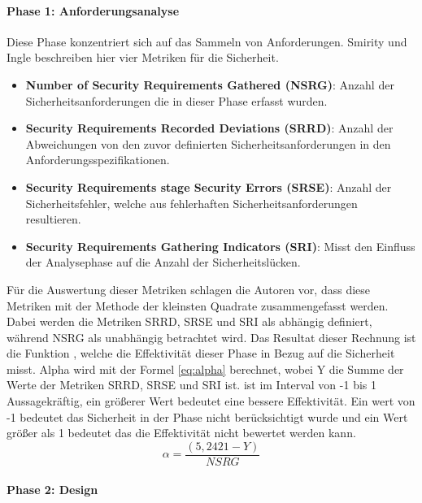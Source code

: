 \documentclass[12pt, a4paper, ngerman]{article}
\begin{document}
\paragraph{Phase 1: Anforderungsanalyse}

Diese Phase konzentriert sich auf das Sammeln von Anforderungen.
Smirity und Ingle beschreiben hier vier Metriken für die Sicherheit.
\begin{itemize}
  \item \textbf{Number of Security Requirements Gathered (NSRG)}: Anzahl der Sicherheitsanforderungen die in dieser Phase erfasst wurden.
  \item \textbf{Security Requirements Recorded Deviations (SRRD)}: Anzahl der Abweichungen von den zuvor definierten Sicherheitsanforderungen in den Anforderungsspezifikationen.
  \item \textbf{Security Requirements stage Security Errors (SRSE)}: Anzahl der Sicherheitsfehler, welche aus fehlerhaften Sicherheitsanforderungen resultieren.
  \item \textbf{Security Requirements Gathering Indicators (SRI)}: Misst den Einfluss der Analysephase auf die Anzahl der Sicherheitslücken. 
\end{itemize}
Für die Auswertung dieser Metriken schlagen die Autoren vor, dass diese Metriken mit der Methode der kleinsten Quadrate zusammengefasst werden.
Dabei werden die Metriken SRRD, SRSE und SRI als abhängig definiert, während NSRG als unabhängig betrachtet wird.
Das Resultat dieser Rechnung ist die Funktion \alpha, welche die Effektivität dieser Phase in Bezug auf die Sicherheit misst.
Alpha wird mit der Formel \ref{eq:alpha} berechnet, wobei Y die Summe der Werte der Metriken SRRD, SRSE und SRI ist.
\alpha ist im Interval von -1 bis 1 Aussagekräftig, ein größerer Wert bedeutet eine bessere Effektivität.
Ein wert von -1 bedeutet das Sicherheit in der Phase nicht berücksichtigt wurde 
und ein Wert größer als 1 bedeutet das die Effektivität nicht bewertet werden kann.
\begin{equation} \label{eq:alpha}
  \alpha = \frac{ \left( 5,2421 - Y \right) }{ NSRG }
\end{equation}

\paragraph{Phase 2: Design}
\end{document}
